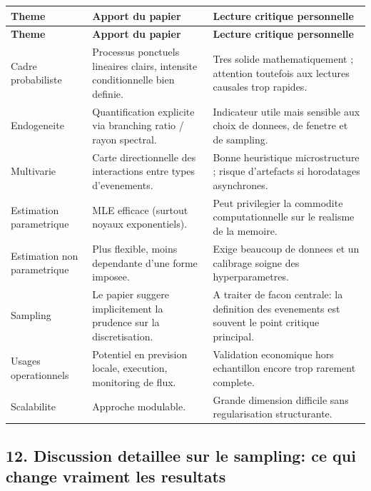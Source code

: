 \documentclass[11pt,a4paper]{article}
\begin{document}
\begin{longtable}{>{\raggedright\arraybackslash}p{3.1cm} >{\raggedright\arraybackslash}p{5.3cm} >{\raggedright\arraybackslash}p{6.0cm}}
\toprule
\textbf{Theme} & \textbf{Apport du papier} & \textbf{Lecture critique personnelle} \\
\midrule
\endfirsthead
\toprule
\textbf{Theme} & \textbf{Apport du papier} & \textbf{Lecture critique personnelle} \\
\midrule
\endhead
Cadre probabiliste & Processus ponctuels lineaires clairs, intensite conditionnelle bien definie. & Tres solide mathematiquement ; attention toutefois aux lectures causales trop rapides. \\
\addlinespace[0.2em]
Endogeneite & Quantification explicite via branching ratio / rayon spectral. & Indicateur utile mais sensible aux choix de donnees, de fenetre et de sampling. \\
\addlinespace[0.2em]
Multivarie & Carte directionnelle des interactions entre types d'evenements. & Bonne heuristique microstructure ; risque d'artefacts si horodatages asynchrones. \\
\addlinespace[0.2em]
Estimation parametrique & MLE efficace (surtout noyaux exponentiels). & Peut privilegier la commodite computationnelle sur le realisme de la memoire. \\
\addlinespace[0.2em]
Estimation non parametrique & Plus flexible, moins dependante d'une forme imposee. & Exige beaucoup de donnees et un calibrage soigne des hyperparametres. \\
\addlinespace[0.2em]
Sampling & Le papier suggere implicitement la prudence sur la discretisation. & A traiter de facon centrale: la definition des evenements est souvent le point critique principal. \\
\addlinespace[0.2em]
Usages operationnels & Potentiel en prevision locale, execution, monitoring de flux. & Validation economique hors echantillon encore trop rarement complete. \\
\addlinespace[0.2em]
Scalabilite & Approche modulable. & Grande dimension difficile sans regularisation structurante. \\
\bottomrule
\end{longtable}

\subsection*{12. Discussion detaillee sur le sampling: ce qui change vraiment les resultats}
\end{document}
